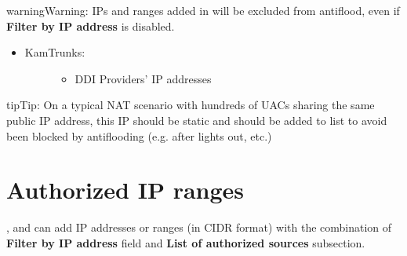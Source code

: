 \documentclass[letterpaper,10pt,english]{sphinxmanual}
\begin{document}
\begin{notice}{warning}{Warning:}
IPs and ranges added in {\hyperref[security_and_maintenance/security/authorized_ip_ranges:client\string-authorized\string-ip\string-ranges]{}} will be excluded from
antiflood, even if \textbf{Filter by IP address} is disabled.
\end{notice}
\begin{itemize}
\item {} \begin{description}
\item[{KamTrunks:}] \leavevmode\begin{itemize}
\item {} 
DDI Providers' IP addresses

\end{itemize}

\end{description}

\end{itemize}

\begin{notice}{tip}{Tip:}
On a typical NAT scenario with hundreds of UACs sharing the same public IP address, this IP should be static and
should be added to {\hyperref[security_and_maintenance/security/authorized_ip_ranges:client\string-authorized\string-ip\string-ranges]{}} list to avoid been blocked by
antiflooding (e.g. after lights out, etc.)
\end{notice}


\section{Authorized IP ranges}
\label{security_and_maintenance/security/authorized_ip_ranges:client-authorized-ip-ranges}\label{security_and_maintenance/security/authorized_ip_ranges::doc}\label{security_and_maintenance/security/authorized_ip_ranges:authorized-ip-ranges}
{\hyperref[administration_portal/client/vpbx/index:vpbx\string-clients]{}}, {\hyperref[administration_portal/client/retail/index:retail\string-clients]{}} and {\hyperref[administration_portal/client/residential/index:residential\string-clients]{}} can add IP addresses or ranges
(in CIDR format) with the combination of \textbf{Filter by IP address} field and \textbf{List of authorized sources} subsection.
\end{document}

